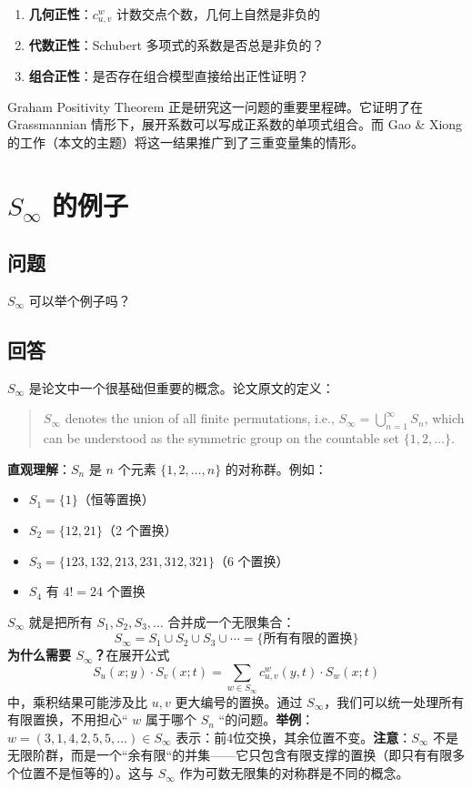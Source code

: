 \begin{enumerate}
\item \textbf{几何正性}：$c^w_{u,v}$ 计数交点个数，几何上自然是非负的
\item \textbf{代数正性}：Schubert 多项式的系数是否总是非负的？
\item \textbf{组合正性}：是否存在组合模型直接给出正性证明？
\end{enumerate}

Graham Positivity Theorem 正是研究这一问题的重要里程碑。它证明了在 Grassmannian 情形下，展开系数可以写成正系数的单项式组合。而 Gao \& Xiong 的工作（本文的主题）将这一结果推广到了三重变量集的情形。
\section{$S_\infty$ 的例子}\label{sec:SInfinityExample}
\subsection{问题}
$S_\infty$ 可以举个例子吗？
\subsection{回答}
$S_\infty$ 是论文中一个很基础但重要的概念。论文原文的定义：
\begin{quote}$S_\infty$ denotes the union of all finite permutations, i.e., $S_\infty = \bigcup_{n=1}^\infty S_n$, which can be understood as the symmetric group on the countable set $\{1, 2, \ldots\}$.
\end{quote}\textbf{直观理解}：$S_n$ 是 $n$ 个元素 $\{1, 2, \ldots, n\}$ 的对称群。例如：
\begin{itemize}
\item $S_1 = \{1\}$（恒等置换）
\item $S_2 = \{12, 21\}$（2 个置换）
\item $S_3 = \{123, 132, 213, 231, 312, 321\}$（6 个置换）
\item $S_4$ 有 $4! = 24$ 个置换
\end{itemize}

\textbf{$S_\infty$} 就是把所有 $S_1, S_2, S_3, \ldots$ 合并成一个无限集合：$$S_\infty = S_1 \cup S_2 \cup S_3 \cup \cdots = \{\text{所有有限的置换}\}$$\textbf{为什么需要 $S_\infty$？}在展开公式$$S_u(x; y) \cdot S_v(x; t) = \sum_{w \in S_\infty} c^w_{u,v}(y, t) \cdot S_w(x; t)$$中，乘积结果可能涉及比 $u, v$ 更大编号的置换。通过 $S_\infty$，我们可以统一处理所有有限置换，不用担心`` $w$ 属于哪个 $S_n$ ``的问题。\textbf{举例}：$w = (3, 1, 4, 2, 5, 5, \ldots) \in S_\infty$ 表示：前4位交换，其余位置不变。\textbf{注意}：$S_\infty$ 不是无限阶群，而是一个``余有限``的并集——它只包含有限支撑的置换（即只有有限多个位置不是恒等的）。这与 $S_\infty$ 作为可数无限集的对称群是不同的概念。
